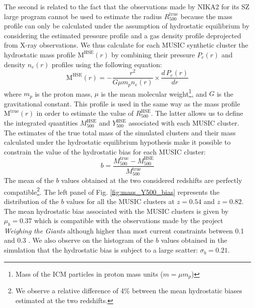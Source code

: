 \documentclass[twocolumn,traditabstract]{aa}
\begin{document}
The second is related to the fact that the observations made by NIKA2 for its SZ large program cannot be used to estimate the radius $R_{500}^{\mathrm{true}}$ because the mass profile can only be calculated under the assumption of hydrostatic equilibrium by considering the estimated pressure profile and a gas density profile deprojected from X-ray observations. We thus calculate for each MUSIC synthetic cluster the hydrostatic mass profile $\mathrm{M^{HSE}}(r)$ by combining their pressure $P_e(r)$ and density $n_e(r)$ profiles using the following equation:
\begin{equation}
\mathrm{M^{HSE}}(r) = -\frac{r^2}{G\mu m_p n_e(r)} \times \frac{d \, P_e(r)}{dr}
\label{eq:mass_HSE}
\end{equation}
where $m_p$ is the proton mass, $\mu$ is the mean molecular weight\footnote{Mass of the ICM particles in proton mass units ($m = \mu m_p$)}, and $G$ is the gravitational constant. This profile is used in the same way as the mass profile $\mathrm{M^{true}}(r)$ in order to estimate the value of $R_{500}^{\mathrm{HSE}}$. The latter allows us to define the integrated quantities $M_{500}^{\mathrm{HSE}}$ and $Y_{500}^{\mathrm{HSE}}$ associated with each MUSIC cluster.\\

The estimates of the true total mass of the simulated clusters and their mass calculated under the hydrostatic equilibrium hypothesis make it possible to constrain the value of the hydrostatic bias for each MUSIC cluster:
\begin{equation}
b = \frac{M_{500}^{\mathrm{true}} - M_{500}^{\mathrm{HSE}}}{M_{500}^{\mathrm{true}}}
\end{equation}
The mean of the $b$ values obtained at the two considered redshifts are perfectly compatible\footnote{We observe a relative difference of 4\% between the mean hydrostatic biases estimated at the two redshifts.}. The left panel of Fig. \ref{fig:mass_Y500_bias} represents the distribution of the $b$ values for all the MUSIC clusters at $z=0.54$ and $z=0.82$. The mean hydrostatic bias associated with the MUSIC clusters is given by $\mu_b = 0.37$ which is compatible with the observations made by the project \emph{Weighing the Giants} \citep{lin14} although higher than most current constraints between 0.1 and 0.3 \citep[see \emph{e.g.} Fig. 10 in][]{sal18}. We also observe on the histogram of the $b$ values obtained in the simulation that the hydrostatic bias is subject to a large scatter: $\sigma_b = 0.21$.\\ 
\end{document}
